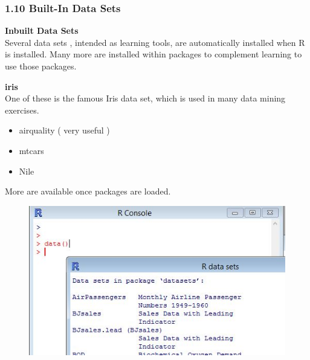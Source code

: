\documentclass{beamer}
\begin{document}
 	
 	\begin{frame}
 		\frametitle{1.10 Built-In Data Sets}
 		\textbf{Inbuilt Data Sets}\\
 		Several data sets , intended as learning tools, are automatically installed when R is installed.
 		Many more are installed within packages to complement learning to use those packages. \\
 		\bigskip
 		
 		\textbf{iris}\\ One
 		of these is the famous Iris data set, which is used in many data mining exercises.
 		
 		\begin{itemize}
 			\item airquality  ( very useful )
 			\item mtcars
 			\item Nile
 		\end{itemize}
 		More are available once packages are loaded.
 		
 	\end{frame}
 	\begin{frame}
 		\begin{figure}
 			\centering
 			\includegraphics[width=1.2\linewidth]{images/Rdatasets}        
 		\end{figure}
 	\end{frame}   
\end{document}
